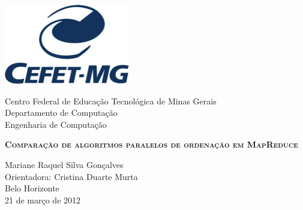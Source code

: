 

\begin{titlepage}




\begin{minipage}{0.2\textwidth}
\begin{flushleft} 
\includegraphics[scale=0.7]{figuras/logo.png} 
\end{flushleft}
\end{minipage}
\hfill
\begin{minipage}{0.7\textwidth}
\begin{flushleft}
\begin{center}
Centro Federal de Educação Tecnológica de Minas Gerais \\
Departamento de Computação \\
Engenharia de Computação
\end{center}
\end{flushleft}
\end{minipage}

\begin{center}

\vfill
\begin{Large}
\textbf{ \textsc{Comparação de algoritmos paralelos de ordenação em MapReduce}} \\[7cm]            
\end{Large}

Mariane Raquel Silva Gonçalves	 \\
Orientadora: Cristina Duarte Murta \\[3cm]

Belo Horizonte \\ 21 de março de 2012 \\
 
\end{center}
\end{titlepage}

